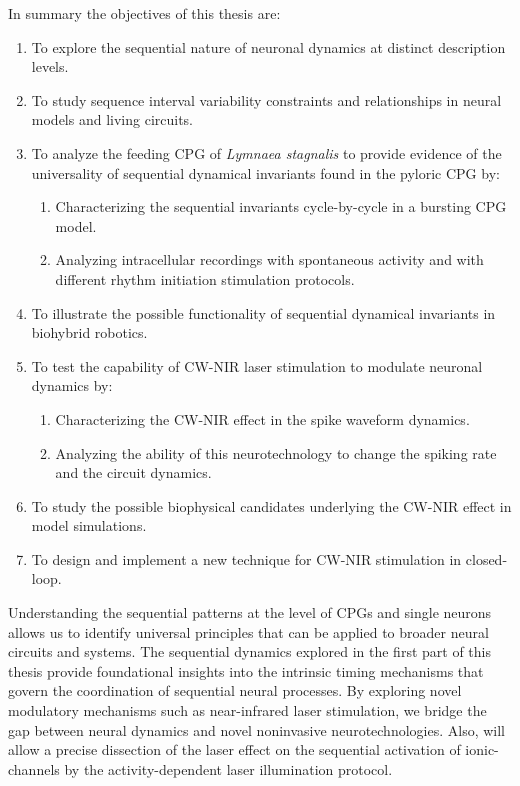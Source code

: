 In summary the objectives of this thesis are:
\begin{enumerate}
    \item To explore the sequential nature of neuronal dynamics at distinct description levels. 
    \item To study sequence interval variability constraints and relationships in neural models and living circuits.
    \item To analyze the feeding CPG of \textit{Lymnaea stagnalis} to provide evidence of the universality of sequential dynamical invariants found in the pyloric CPG by:
    \begin{enumerate}
        \item Characterizing the sequential invariants cycle-by-cycle in a bursting CPG model. 
        \item Analyzing intracellular recordings with spontaneous activity and with different rhythm initiation stimulation protocols. 
    \end{enumerate}
    \item To illustrate the possible functionality of sequential dynamical invariants in biohybrid robotics. 
    \item To test the capability of CW-NIR laser stimulation to modulate neuronal dynamics by: 
    \begin{enumerate}
        \item Characterizing the CW-NIR effect in the spike waveform dynamics. 
        \item Analyzing  the ability of this neurotechnology to change the spiking rate and the circuit dynamics. 
    \end{enumerate}
    \item To study the possible biophysical candidates underlying the CW-NIR effect in model simulations. 
    \item To design and implement a new technique for CW-NIR stimulation in closed-loop. 
\end{enumerate}

Understanding the sequential patterns at the level of CPGs and single neurons allows us to identify universal principles that can be applied to broader neural circuits and systems. The sequential dynamics explored in the first part of this thesis provide foundational insights into the intrinsic timing mechanisms that govern the coordination of sequential neural processes. By exploring novel modulatory  mechanisms such as near-infrared laser stimulation, we bridge the gap between neural dynamics and novel noninvasive neurotechnologies. Also, will allow a precise dissection of the laser effect on the sequential activation of  ionic-channels by the activity-dependent laser illumination protocol. 
